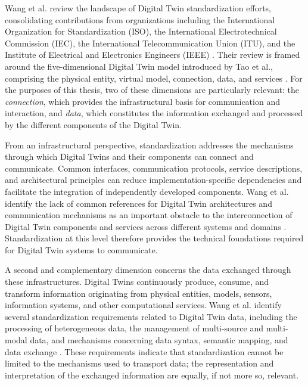 Wang et al. review the landscape of Digital Twin standardization efforts, consolidating contributions from organizations including the International Organization for Standardization (ISO), the International Electrotechnical Commission (IEC), the International Telecommunication Union (ITU), and the Institute of Electrical and Electronics Engineers (IEEE) \cite{wang2022standards}. Their review is framed around the five-dimensional Digital Twin model introduced by Tao et al., comprising the physical entity, virtual model, connection, data, and services \cite{tao2019,qi2021}. For the purposes of this thesis, two of these dimensions are particularly relevant: the \textit{connection}, which provides the infrastructural basis for communication and interaction, and \textit{data}, which constitutes the information exchanged and processed by the different components of the Digital Twin.

From an infrastructural perspective, standardization addresses the mechanisms through which Digital Twins and their components can connect and communicate. Common interfaces, communication protocols, service descriptions, and architectural principles can reduce implementation-specific dependencies and facilitate the integration of independently developed components. Wang et al. identify the lack of common references for Digital Twin architectures and communication mechanisms as an important obstacle to the interconnection of Digital Twin components and services across different systems and domains \cite{wang2022standards}. Standardization at this level therefore provides the technical foundations required for Digital Twin systems to communicate.

A second and complementary dimension concerns the data exchanged through these infrastructures. Digital Twins continuously produce, consume, and transform information originating from physical entities, models, sensors, information systems, and other computational services. Wang et al. identify several standardization requirements related to Digital Twin data, including the processing of heterogeneous data, the management of multi-source and multi-modal data, and mechanisms concerning data syntax, semantic mapping, and data exchange \cite{wang2022standards}. These requirements indicate that standardization cannot be limited to the mechanisms used to transport data; the representation and interpretation of the exchanged information are equally, if not more so, relevant.

